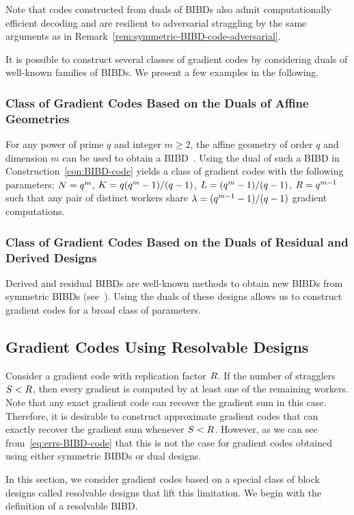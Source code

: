 \documentclass[conference,letterpaper]{IEEEtran}
\begin{document}
Note that codes constructed from duals of BIBDs also admit computationally efficient decoding and are resilient to adversarial straggling by the same arguments as in Remark~\ref{rem:symmetric-BIBD-code-adversarial}.

It is possible to construct several classes of gradient codes by considering duals of well-known families of BIBDs. We present a few examples in the following.

\subsubsection{Class of Gradient Codes Based on the Duals of Affine Geometries} For any power of prime $q$ and integer $m\geq 2$, the affine geometry of order $q$ and dimension $m$ can be used to obtain a BIBD~\cite{Stinson:2003}. Using the dual of such a BIBD in Construction~\ref{con:BIBD-code} yields a class of gradient codes with the following parameters: $N = q^m$, $K = q(q^{m}-1)/(q-1)$, $L = (q^{m}-1)/(q-1)$, $R = q^{m-1}$ such that any pair of distinct workers share $\lambda = (q^{m-1}-1)/(q-1)$ gradient computations. 

\subsubsection{Class of Gradient Codes Based on the Duals of Residual and Derived Designs} Derived and residual BIBDs are well-known methods to obtain new BIBDs from symmetric BIBDs (see~\cite[Chapter 2.2]{Stinson:2003}). Using the duals of these designs allows us to construct gradient codes for a broad class of parameters. 

\subsection{Gradient Codes Using Resolvable Designs}
\label{sec:code-r-bibd}
Consider a gradient code with replication factor $R$. If the number of stragglers $S < R$, then every gradient is computed by at least one of the remaining workers. Note that any exact gradient code can recover the gradient sum in this case. Therefore, it is desirable to construct approximate gradient codes that can exactly recover the gradient sum whenever $S < R$. However, as we can see from~\eqref{eq:errs-BIBD-code} that this is not the case for gradient codes obtained using either symmetric BIBDs or dual designs.

In this section, we consider gradient codes based on a special class of block designs called resolvable designs that lift this limitation. We begin with the definition of a resolvable BIBD.
\end{document}
